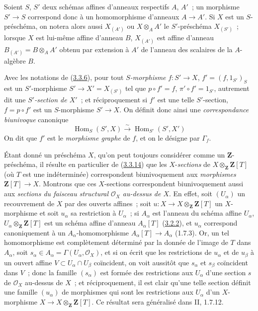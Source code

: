 \begin{env}[3.3.13]
\label{I.3.3.13-fr}
Soient $S$, $S'$ deux schémas affines d'anneaux respectifs $A$, $A'$~; un
morphisme $S'\to S$ correspond donc à un homomorphisme d'anneaux $A\to A'$.
Si $X$ est un $S$-préschéma, on notera alors aussi $X_{(A')}$ ou
$X\otimes_A A'$ le $S'$-préschéma $X_{(S')}$~; lorsque $X$ est lui-même
affine d'anneau $B$, $X_{(A')}$ est affine d'anneau
$B_{(A')}=B\otimes_A A'$ obtenu par extension à $A'$ de l'anneau des scalaires
de la $A$-algèbre $B$.
\end{env}

\begin{env}[3.3.14]
\label{I.3.3.14-fr}
Avec les notations de (\hyperref[I.3.3.6-fr]{3.3.6}), pour tout
\emph{$S$-morphisme} $f:S'\to X$, $f'=(f,1_{S'})_S$ est un $S'$-morphisme
$S'\to X'=X_{(S')}$ tel que $p\circ f'=f$, $\pi'\circ f'=1_{S'}$, autrement
dit une \emph{$S'$-section de $X'$}~; et réciproquement si $f'$ est une telle
$S'$-section, $f=p\circ f'$ est un $S$-morphisme $S'\to X$. On définit donc
ainsi une \emph{correspondance biunivoque} canonique
\label{I.3.3.14.correspondence-fr}
\[
  \operatorname{Hom}_S(S',X)\overset{\sim}{\longrightarrow}
  \operatorname{Hom}_{S'}(S',X')
\]
On dit que $f'$ est le \emph{morphisme graphe} de $f$, et on le désigne par
$\Gamma_f$.
\end{env}

\begin{env}[3.3.15]
\label{I.3.3.15-fr}
Étant donné un préschéma $X$, qu'on peut toujours considérer comme un
$\mathbf{Z}$-préschéma, il résulte en particulier de
(\hyperref[I.3.3.14-fr]{3.3.14}) que les $X$-\emph{sections} de
$X\otimes_{\mathbf{Z}}\mathbf{Z}[T]$ (où $T$ est une indéterminée)
correspondent biunivoquement aux \emph{morphismes}
$\mathbf{Z}[T]\to X$. Montrons que ces $X$-sections correspondent
biunivoquement aussi aux \emph{sections du faisceau structural
$\mathcal{O}_X$ au-dessus de $X$}. En effet, soit $(U_\alpha)$ un recouvrement
de $X$ par des ouverts affines~; soit
$u:X\to X\otimes_{\mathbf{Z}}\mathbf{Z}[T]$ un $X$-morphisme et soit
$u_\alpha$ sa restriction à $U_\alpha$~; si $A_\alpha$ est l'anneau du schéma
affine $U_\alpha$, $U_\alpha\otimes_{\mathbf{Z}}\mathbf{Z}[T]$ est un schéma
affine d'anneau $A_\alpha[T]$ (\hyperref[I.3.2.2-fr]{3.2.2}), et $u_\alpha$
correspond canoniquement à un $A_\alpha$-homomorphisme
$A_\alpha[T]\to A_\alpha$ (1.7.3). Or, un tel homomorphisme est complètement
déterminé par la donnée de l'image de $T$ dans $A_\alpha$, soit
$s_\alpha\in A_\alpha=\Gamma(U_\alpha,\mathcal{O}_X)$, et si on écrit que les
restrictions de $u_\alpha$ et de $u_\beta$ à un ouvert affine
$V\subset U_\alpha\cap U_\beta$ coïncident, on voit aussitôt que $s_\alpha$
et $s_\beta$ coïncident dans $V$~; donc la famille $(s_\alpha)$ est formée des
restrictions aux $U_\alpha$ d'une section $s$ de $\mathcal{O}_X$ au-dessus de
$X$~; et réciproquement, il est clair qu'une telle section définit une famille
$(u_\alpha)$ de morphismes qui sont les restrictions aux $U_\alpha$ d'un
$X$-morphisme $X\to X\otimes_{\mathbf{Z}}\mathbf{Z}[T]$. Ce résultat sera
généralisé dans II, 1.7.12.
\end{env}

